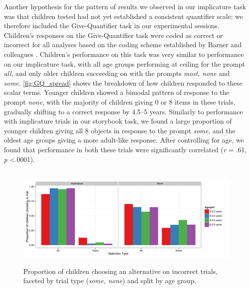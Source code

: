 \documentclass[man]{apa2}
\begin{document}
Another hypothesis for the pattern of results we observed in our implicature task was that children tested had not yet established a consistent quantifier scale; we therefore included the Give-Quantifier task in our experimental sessions. Children's responses on the Give-Quantifier task were coded as correct or incorrect for all analyses based on the coding scheme established by Barner and colleagues \cite{barner2009}. Children's performance on this task was very similar to performance on our implicature task, with all age groups performing at ceiling for the prompt \textit{all}, and only older children succeeding on with the prompts \textit{most, none} and \textit{some}. \ref{fig:GQ_spread} shows the breakdown of how children responded to these scalar terms. Younger children showed a bimodal pattern of response to the prompt \textit{none}, with the majority of children giving 0 or 8 items in these trials, gradually shifting to a correct response by 4.5--5 years. Similarly to performance with implicature trials in our storybook task, we found a large proportion of younger children giving all 8 objects in response to the prompt \textit{some}, and the oldest age groups giving a more adult-like response. After controlling for age, we found that performance in both these trials were significantly correlated (\textit{r} = .61, \textit{p} \textless .0001). 

\begin{figure} 
 \begin{center} 
  \includegraphics[height=2in]{figures/exp3_wrong.pdf} 
  \caption{\label{fig:exp3_wrong} Proportion of children choosing an alternative on incorrect trials, faceted by trial type (\textit{some, none}) and split by age group.} 
 \end{center} 
\end{figure}
\end{document}
